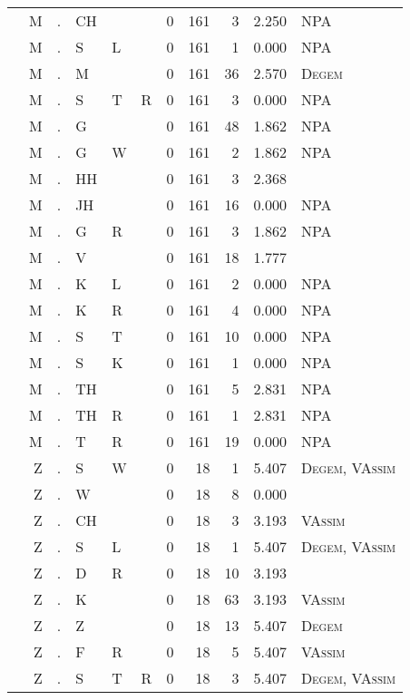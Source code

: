 \begin{longtable}{r@{ } r@{ } c@{ } l@{ } l@{ } l@{ } r r r r l }
 & M & . & CH &  &  & 0 & 161 & 3 & 2.250 & \textsc{NPA} \\
 & M & . & S & L &  & 0 & 161 & 1 & 0.000 & \textsc{NPA} \\
 & M & . & M &  &  & 0 & 161 & 36 & 2.570 & \textsc{Degem} \\
 & M & . & S & T & R & 0 & 161 & 3 & 0.000 & \textsc{NPA} \\
 & M & . & G &  &  & 0 & 161 & 48 & 1.862 & \textsc{NPA} \\
 & M & . & G & W &  & 0 & 161 & 2 & 1.862 & \textsc{NPA} \\
 & M & . & HH &  &  & 0 & 161 & 3 & 2.368 &  \\
 & M & . & JH &  &  & 0 & 161 & 16 & 0.000 & \textsc{NPA} \\
 & M & . & G & R &  & 0 & 161 & 3 & 1.862 & \textsc{NPA} \\
 & M & . & V &  &  & 0 & 161 & 18 & 1.777 &  \\
 & M & . & K & L &  & 0 & 161 & 2 & 0.000 & \textsc{NPA} \\
 & M & . & K & R &  & 0 & 161 & 4 & 0.000 & \textsc{NPA} \\
 & M & . & S & T &  & 0 & 161 & 10 & 0.000 & \textsc{NPA} \\
 & M & . & S & K &  & 0 & 161 & 1 & 0.000 & \textsc{NPA} \\
 & M & . & TH &  &  & 0 & 161 & 5 & 2.831 & \textsc{NPA} \\
 & M & . & TH & R &  & 0 & 161 & 1 & 2.831 & \textsc{NPA} \\
 & M & . & T & R &  & 0 & 161 & 19 & 0.000 & \textsc{NPA} \\
 & Z & . & S & W &  & 0 & 18 & 1 & 5.407 & \textsc{Degem}, \textsc{VAssim} \\
 & Z & . & W &  &  & 0 & 18 & 8 & 0.000 &  \\
 & Z & . & CH &  &  & 0 & 18 & 3 & 3.193 & \textsc{VAssim} \\
 & Z & . & S & L &  & 0 & 18 & 1 & 5.407 & \textsc{Degem}, \textsc{VAssim} \\
 & Z & . & D & R &  & 0 & 18 & 10 & 3.193 &  \\
 & Z & . & K &  &  & 0 & 18 & 63 & 3.193 & \textsc{VAssim} \\
 & Z & . & Z &  &  & 0 & 18 & 13 & 5.407 & \textsc{Degem} \\
 & Z & . & F & R &  & 0 & 18 & 5 & 5.407 & \textsc{VAssim} \\
 & Z & . & S & T & R & 0 & 18 & 3 & 5.407 & \textsc{Degem}, \textsc{VAssim} \\

\end{longtable}
